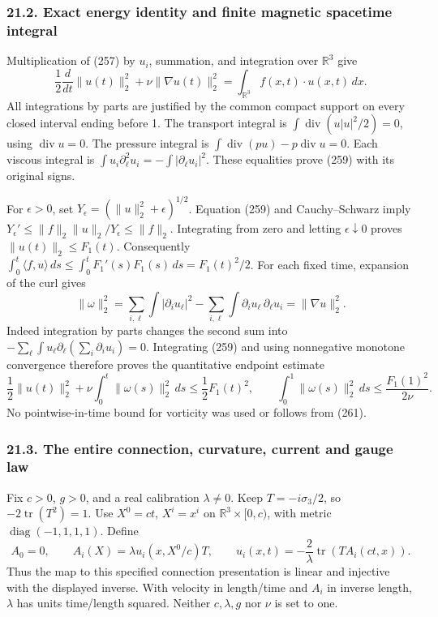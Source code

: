 \documentclass[
  11pt,
]{article}
\begin{document}
\subsubsection{21.2. Exact energy identity and finite magnetic spacetime
integral}\label{exact-energy-identity-and-finite-magnetic-spacetime-integral}

Multiplication of (257) by \(u_i\), summation, and integration over
\(\mathbb R^3\) give \[
 \frac12\frac{d}{dt}\|u(t)\|_2^2+
 \nu\|\nabla u(t)\|_2^2=\int_{\mathbb R^3}f(x,t)\cdot u(x,t)\,dx .
 \tag{259}
\] All integrations by parts are justified by the common compact support
on every closed interval ending before 1. The transport integral is
\(\int\operatorname{div}(u|u|^2/2)=0\), using \(\operatorname{div}u=0\).
The pressure integral is
\(\int\operatorname{div}(pu)-p\operatorname{div}u=0\). Each viscous
integral is \(\int u_i\partial_\ell^2u_i=-\int|\partial_\ell u_i|^2\).
These equalities prove (259) with its original signs.

For \(\epsilon>0\), set \(Y_\epsilon=(\|u\|_2^2+\epsilon)^{1/2}\).
Equation (259) and Cauchy--Schwarz imply
\(Y_\epsilon'\le\|f\|_2\|u\|_2/Y_\epsilon\le\|f\|_2\). Integrating from
zero and letting \(\epsilon\downarrow0\) proves
\(\|u(t)\|_2\le F_1(t)\). Consequently
\(\int_0^t\langle f,u\rangle\,ds\le
\int_0^tF_1'(s)F_1(s)\,ds=F_1(t)^2/2\). For each fixed time, expansion
of the curl gives \[
 \|\omega\|_2^2
 =\sum_{i,\ell}\int|\partial_i u_\ell|^2
 -\sum_{i,\ell}\int\partial_i u_\ell\,\partial_\ell u_i
 =\|\nabla u\|_2^2 .
 \tag{260}
\] Indeed integration by parts changes the second sum into
\(-\sum_\ell\int u_\ell\partial_\ell(\sum_i\partial_i u_i)=0\).
Integrating (259) and using nonnegative monotone convergence therefore
proves the quantitative endpoint estimate \[
 \frac12\|u(t)\|_2^2+\nu\int_0^t\|\omega(s)\|_2^2\,ds
 \le\frac12F_1(t)^2,\qquad
 \int_0^1\|\omega(s)\|_2^2\,ds\le\frac{F_1(1)^2}{2\nu}.
 \tag{261}
\] No pointwise-in-time bound for vorticity was used or follows from
(261).

\subsubsection{21.3. The entire connection, curvature, current and gauge
law}\label{the-entire-connection-curvature-current-and-gauge-law}

Fix \(c>0\), \(g>0\), and a real calibration \(\lambda\ne0\). Keep
\(T=-i\sigma_3/2\), so \(-2\operatorname{tr}(T^2)=1\). Use \(X^0=ct\),
\(X^i=x^i\) on \(\mathbb R^3\times[0,c)\), with metric
\(\operatorname{diag}(-1,1,1,1)\). Define \[
 A_0=0,\qquad A_i(X)=\lambda u_i(x,X^0/c)T,\qquad
 u_i(x,t)=-\frac{2}{\lambda}\operatorname{tr}(T A_i(ct,x)).
 \tag{262}
\] Thus the map to this specified connection presentation is linear and
injective with the displayed inverse. With velocity in length/time and
\(A_i\) in inverse length, \(\lambda\) has units time/length squared.
Neither \(c,\lambda,g\) nor \(\nu\) is set to one.
\end{document}
